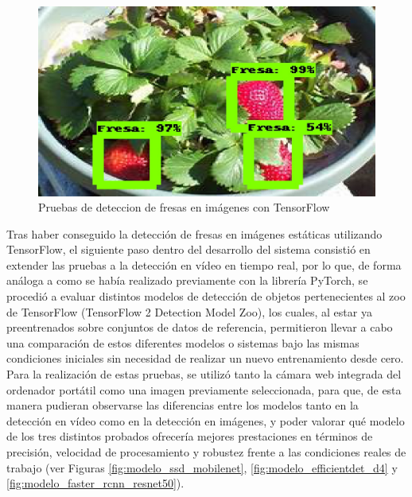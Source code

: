 \begin{figure}[H]
\begin{minipage}{0.45\textwidth}
  \end{minipage}
  \hspace{2mm}
  \begin{minipage}{0.45\textwidth}
    \centering
    \includegraphics[width=\linewidth]{figs/1000.jpeg}
  \end{minipage}
  \caption{Pruebas de deteccion de fresas en imágenes con TensorFlow}
  \label{fig:Deteccion_Fresas_Imagenes_TF}
  \end{figure}

Tras haber conseguido la detección de fresas en imágenes estáticas utilizando TensorFlow, el siguiente paso dentro del desarrollo del sistema consistió en extender las pruebas a la detección en vídeo en tiempo real, por lo que, de forma análoga a como se había realizado previamente con la librería PyTorch, se procedió a evaluar distintos modelos de detección de objetos pertenecientes al zoo de TensorFlow (TensorFlow 2 Detection Model Zoo), los cuales, al estar ya preentrenados sobre conjuntos de datos de referencia, permitieron llevar a cabo una comparación de estos diferentes modelos o sistemas bajo las mismas condiciones iniciales sin necesidad de realizar un nuevo entrenamiento desde cero. \\

Para la realización de estas pruebas, se utilizó tanto la cámara web integrada del ordenador portátil como una imagen previamente seleccionada, para que, de esta manera pudieran observarse las diferencias entre los modelos tanto en la detección en vídeo como en la detección en imágenes, y poder valorar qué modelo de los tres distintos probados ofrecería mejores prestaciones en términos de precisión, velocidad de procesamiento y robustez frente a las condiciones reales de trabajo (ver Figuras  \ref{fig:modelo_ssd_mobilenet}, \ref{fig:modelo_efficientdet_d4} y \ref{fig:modelo_faster_rcnn_resnet50}). 

